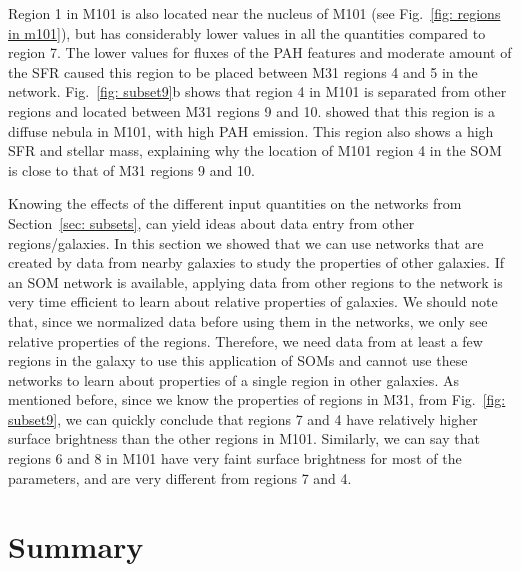     Region 1 in M101 is also located near the nucleus of M101 (see Fig.~\ref{fig: regions in m101}), but has considerably lower values in all the quantities compared to region 7.
    The lower values for fluxes of the PAH features and moderate amount of the SFR caused this region to be placed between M31 regions 4 and 5 in the network. 
    Fig.~\ref{fig: subset9}b shows that region 4 in M101 is separated from other regions and located between M31 regions 9 and 10.
    \cite{Gordon08} showed that this region is a diffuse nebula in M101, with high PAH emission. 
    This region also shows a high SFR and stellar mass, explaining why the location of M101 region 4 in the SOM is close to that of M31 regions 9 and 10.
    
    Knowing the effects of the different input quantities on the networks from Section~\ref{sec: subsets}, can yield ideas about data entry from other regions/galaxies.
    In this section we showed that we can use networks that are created by data from nearby galaxies to study the properties of other galaxies.
    If an SOM network is available, applying data from other regions to the network is very time efficient to learn about relative properties of galaxies.
    We should note that, since we normalized data before using them in the networks, we only see relative properties of the regions.
    Therefore, we need data from at least a few regions in the galaxy to use this application of SOMs and cannot use these networks to learn about properties of a single region in other galaxies.
    As mentioned before, since we know the properties of regions in M31, from Fig.~\ref{fig: subset9}, we can quickly conclude that regions 7 and 4 have relatively higher surface brightness than the other regions in M101. 
    Similarly, we can say that regions 6 and 8 in M101 have very faint surface brightness for most of the parameters, and are very different from regions 7 and 4.
    
    
    
\section{Summary}
\label{sec: summary}

